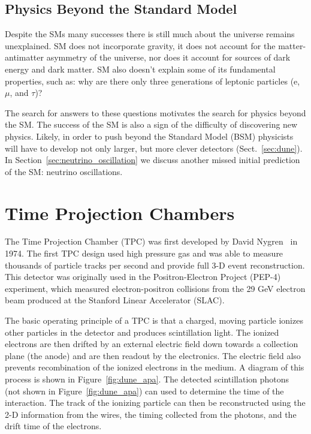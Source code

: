 \subsection{Physics Beyond the Standard Model}
Despite the SMs many successes there is still much about the universe remains unexplained.
SM does not incorporate gravity, it does not account for the matter-antimatter asymmetry of the universe, nor does it account for sources of dark energy and dark matter.
SM also doesn't explain some of its fundamental properties, such as: why are there only three generations of leptonic particles (e, $\mu$, and $\tau$)?

The search for answers to these questions motivates the search for physics beyond the SM.
The success of the SM is also a sign of the difficulty of discovering new physics.
Likely, in order to push beyond the Standard Model (BSM) physicists will have to develop not only larger, but more clever detectors (Sect.~\ref{sec:dune}).
In Section~\ref{sec:neutrino_oscillation} we discuss another missed initial prediction of the SM: neutrino oscillations. 

\section{Time Projection Chambers}
\label{sec:tpcs}
The Time Projection Chamber (TPC) was first developed by David Nygren~\cite{lartpc:nygren} in 1974.
The first TPC design used high pressure gas and was able to measure thousands of particle tracks per second and provide full 3-D event reconstruction.
This detector was originally used in the Positron-Electron Project (PEP-4) experiment, which measured electron-positron collisions from the 29 GeV electron beam produced at the Stanford Linear Accelerator (SLAC).

The basic operating principle of a TPC is that a charged, moving particle ionizes other particles in the detector and produces scintillation light.
The ionized electrons are then drifted by an external electric field down towards a collection plane (the anode) and are then readout by the electronics.
The electric field also prevents recombination of the ionized electrons in the medium. 
A diagram of this process is shown in Figure~\ref{fig:dune_apa}.
The detected scintillation photons (not shown in Figure~\ref{fig:dune_apa}) can used to determine the time of the interaction.
The track of the ionizing particle can then be reconstructed using the 2-D information from the wires, the timing collected from the photons, and the drift time of the electrons.


